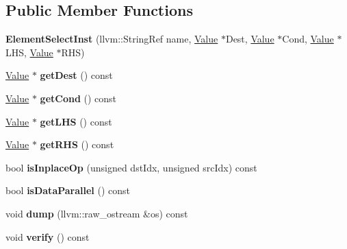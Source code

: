 \subsection*{Public Member Functions}
\begin{DoxyCompactItemize}
\item 
\mbox{\label{classglow_1_1_element_select_inst_ad7956bb0c4ffe7a344522d0c551fb5a3}} 
{\bfseries Element\+Select\+Inst} (llvm\+::\+String\+Ref name, \hyperlink{classglow_1_1_value}{Value} $\ast$Dest, \hyperlink{classglow_1_1_value}{Value} $\ast$Cond, \hyperlink{classglow_1_1_value}{Value} $\ast$L\+HS, \hyperlink{classglow_1_1_value}{Value} $\ast$R\+HS)
\item 
\mbox{\label{classglow_1_1_element_select_inst_a3ac486559577c7fbfa69c224cd247546}} 
\hyperlink{classglow_1_1_value}{Value} $\ast$ {\bfseries get\+Dest} () const
\item 
\mbox{\label{classglow_1_1_element_select_inst_ade992c2c8176153695d7d7ab8c0a72b0}} 
\hyperlink{classglow_1_1_value}{Value} $\ast$ {\bfseries get\+Cond} () const
\item 
\mbox{\label{classglow_1_1_element_select_inst_a7c1164421745b657edbc893ff07a231b}} 
\hyperlink{classglow_1_1_value}{Value} $\ast$ {\bfseries get\+L\+HS} () const
\item 
\mbox{\label{classglow_1_1_element_select_inst_acce65153c21ab4f3c8b6e0bff0f18e7e}} 
\hyperlink{classglow_1_1_value}{Value} $\ast$ {\bfseries get\+R\+HS} () const
\item 
\mbox{\label{classglow_1_1_element_select_inst_a8efcc68e30c13420c836feb7b2cada38}} 
bool {\bfseries is\+Inplace\+Op} (unsigned dst\+Idx, unsigned src\+Idx) const
\item 
\mbox{\label{classglow_1_1_element_select_inst_ac4fc450b386ffc30f4f5a27019800c2d}} 
bool {\bfseries is\+Data\+Parallel} () const
\item 
\mbox{\label{classglow_1_1_element_select_inst_aa2dd7755fe2ebc8ee3bbc3ed9403e76d}} 
void {\bfseries dump} (llvm\+::raw\+\_\+ostream \&os) const
\item 
\mbox{\label{classglow_1_1_element_select_inst_ad11b2b03c29892da3cb77dc9b74d49e5}} 
void {\bfseries verify} () const
\end{DoxyCompactItemize}
